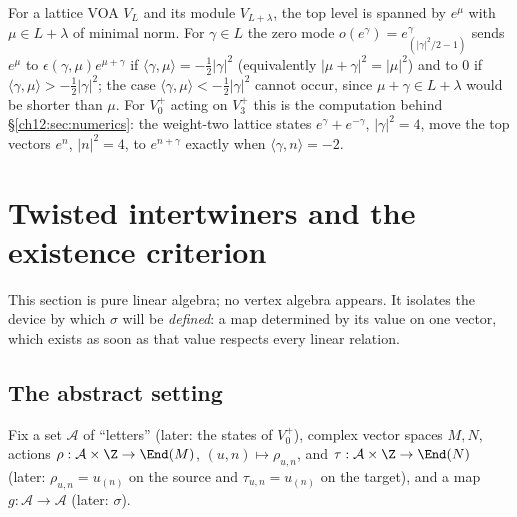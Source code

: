 \begin{example}\label{ch12:ex:lattice}
For a lattice VOA $V_L$ and its module $V_{L+\lambda}$, the top level is spanned by $e^\mu$ with
$\mu\in L+\lambda$ of minimal norm.  For $\gamma\in L$ the zero mode $o(e^\gamma)=e^\gamma_{(|\gamma|^2/2-1)}$
sends $e^\mu$ to $\epsilon(\gamma,\mu)e^{\mu+\gamma}$ if $\langle\gamma,\mu\rangle=-\tfrac12|\gamma|^2$
(equivalently $|\mu+\gamma|^2=|\mu|^2$) and to $0$ if $\langle\gamma,\mu\rangle>-\tfrac12|\gamma|^2$; the case
$\langle\gamma,\mu\rangle<-\tfrac12|\gamma|^2$ cannot occur, since $\mu+\gamma\in L+\lambda$ would be shorter
than $\mu$.  For $V_0^+$ acting on $V_3^+$ this is the computation behind \S\ref{ch12:sec:numerics}: the
weight-two lattice states $e^\gamma+e^{-\gamma}$, $|\gamma|^2=4$, move the top vectors $e^n$, $|n|^2=4$, to
$e^{n+\gamma}$ exactly when $\langle\gamma,n\rangle=-2$.
\end{example}

\section{Twisted intertwiners and the existence criterion}\label{ch12:sec:twint}

This section is pure linear algebra; no vertex algebra appears.  It isolates the device by which
$\sigma$ will be \emph{defined}: a map determined by its value on one vector, which exists as soon as
that value respects every linear relation.

\subsection{The abstract setting}

Fix a set $\mathcal A$ of ``letters'' (later: the states of $V_0^+$), complex vector spaces $M,N$,
actions $\rho:\mathcal A\times\Z\to\End(M)$, $(u,n)\mapsto\rho_{u,n}$, and $\tau:\mathcal A\times\Z\to\End(N)$
(later: $\rho_{u,n}=u_{(n)}$ on the source and $\tau_{u,n}=u_{(n)}$ on the target), and a map
$g:\mathcal A\to\mathcal A$ (later: $\sigma$).

